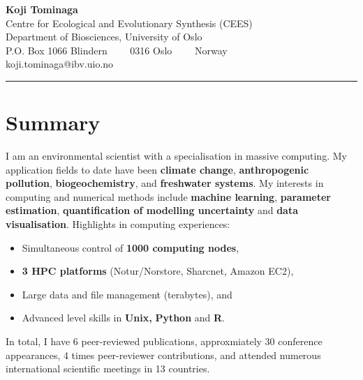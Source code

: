 \documentclass[10pt, a4paper]{article}
\begin{document}
\selectfont


\begin{center}
{\LARGE \textbf{Koji Tominaga}}
\\
Centre for Ecological and Evolutionary Synthesis (CEES)\\
Department of Biosciences, University of Oslo\\
P.O. Box 1066 Blindern\ \ \textbullet
\ \ 0316 Oslo\ \ \textbullet 
\ \ Norway
\\
koji.tominaga@ibv.uio.no
\end{center}

\hrule
\vspace{-0.4em}

\section*{Summary}
I am an environmental scientist with a specialisation in massive
computing. My application fields to date have been \textbf{climate change},
\textbf{anthropogenic pollution}, \textbf{biogeochemistry}, and \textbf{freshwater
systems}. My interests in computing and numerical methods include
\textbf{machine learning}, \textbf{parameter estimation}, \textbf{quantification of modelling
uncertainty} and \textbf{data visualisation}. Highlights in computing experiences:
\begin{itemize}
  \itemsep-0.1em
  \item Simultaneous control of \textbf{1000 computing nodes}, 
  \item \textbf{3 HPC platforms} (Notur/Norstore, Sharcnet, Amazon EC2),
  \item Large data and file management (terabytes), and 
  \item Advanced level skills in \textbf{Unix,} \textbf{Python} and \textbf{R}.
\end{itemize}





\nocite{couture_modelling_2014}
\nocite{tominaga_lake_2013}
\nocite{tominaga_future_2012}
\nocite{tominaga_predicting_2010}
\nocite{tominaga_voyage_2009-1}


\flushleft In total, I have 6 peer-reviewed publications, approxmiately 30 conference appearances, 4 times peer-reviewer contributions, and attended numerous international scientific meetings in 13 countries.
\end{document}
